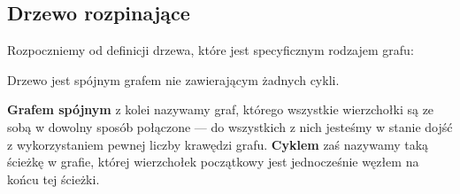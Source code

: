 \subsection{Drzewo rozpinające}

Rozpoczniemy od definicji drzewa, które jest specyficznym rodzajem grafu:

\begin{definition}
	Drzewo jest spójnym grafem nie zawierającym żadnych cykli.
\end{definition}

\textbf{Grafem spójnym} z kolei nazywamy graf, którego wszystkie wierzchołki są ze sobą w dowolny sposób połączone --- do wszystkich z nich jesteśmy w stanie dojść z wykorzystaniem pewnej liczby krawędzi grafu. \textbf{Cyklem} zaś nazywamy taką ścieżkę w grafie, której wierzchołek początkowy jest jednocześnie węzłem na końcu tej ścieżki.

